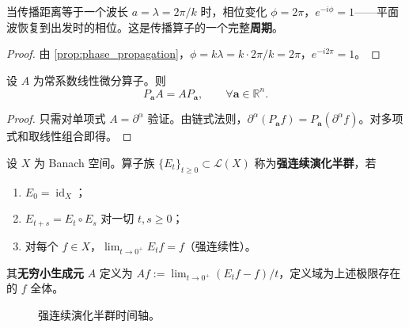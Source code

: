 \begin{corollary}[传播的周期闭合]\label{cor:propagation_period_closure}
当传播距离等于一个波长 $a = \lambda = 2\pi/k$ 时，相位变化 $\phi = 2\pi$，$e^{-i\phi}=1$——平面波恢复到出发时的相位。这是传播算子的一个完整\textbf{周期}。
\end{corollary}

\begin{proof}
由 \cref{prop:phase_propagation}，$\phi = k\lambda = k\cdot 2\pi/k = 2\pi$，$e^{-i2\pi}=1$。
\end{proof}

\begin{proposition}[传播算子与常系数微分算子交换]\label{prop:propagation_commutes_translation}
设 $A$ 为常系数线性微分算子。则
\[
P_{\mathbf{a}}A = A P_{\mathbf{a}}, \qquad \forall \mathbf{a}\in\mathbb{R}^n.
\]
\end{proposition}

\begin{proof}
只需对单项式 $A = \partial^\alpha$ 验证。由链式法则，$\partial^\alpha(P_{\mathbf{a}}f) = P_{\mathbf{a}}(\partial^\alpha f)$。对多项式和取线性组合即得。
\end{proof}

\begin{definition}[演化半群]\label{def:evolution_semigroup}
设 $X$ 为 Banach 空间。算子族 $\{E_t\}_{t\ge 0}\subset\mathcal{L}(X)$ 称为\textbf{强连续演化半群}，若
\begin{enumerate}[label=(\roman*)]
    \item $E_0 = \operatorname{id}_X$；
    \item $E_{t+s} = E_t\circ E_s$ 对一切 $t,s\ge 0$；
    \item 对每个 $f\in X$，$\lim_{t\to 0^+}E_t f = f$（强连续性）。
\end{enumerate}
其\textbf{无穷小生成元} $A$ 定义为 $Af := \lim_{t\to 0^+}(E_t f - f)/t$，定义域为上述极限存在的 $f$ 全体。
\end{definition}

\begin{figure}[htbp]
\centering
{}
\caption{强连续演化半群时间轴。}
\label{fig:evolution_semigroup}
\end{figure}

